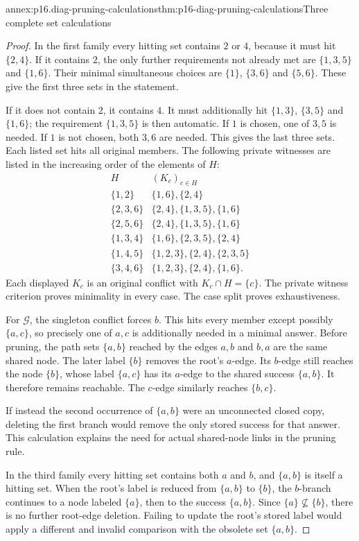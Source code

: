 \begin{annexitem}{annex:p16.diag-pruning-calculations}{thm:p16-diag-pruning-calculations}{Three complete set calculations}
\begin{proof}
In the first family every hitting set contains \(2\)
or \(4\), because it must hit \(\{2,4\}\).
If it contains \(2\), the only further requirements
not already met are \(\{1,3,5\}\) and \(\{1,6\}\).
Their minimal simultaneous choices are \(\{1\}\),
\(\{3,6\}\) and \(\{5,6\}\). These give the first
three sets in the statement.

If it does not contain \(2\), it contains \(4\).
It must additionally hit \(\{1,3\}\), \(\{3,5\}\)
and \(\{1,6\}\); the requirement \(\{1,3,5\}\)
is then automatic. If \(1\) is chosen, one of \(3,5\)
is needed. If \(1\) is not chosen, both \(3,6\)
are needed. This gives the last three sets.
Each listed set hits all original members. The
following private witnesses are listed in the
increasing order of the elements of \(H\):
\[
\begin{array}{c|l}
H&(K_c)_{c\in H}\\ \hline
\{1,2\}&\{1,6\},\{2,4\}\\
\{2,3,6\}&\{2,4\},\{1,3,5\},\{1,6\}\\
\{2,5,6\}&\{2,4\},\{1,3,5\},\{1,6\}\\
\{1,3,4\}&\{1,6\},\{2,3,5\},\{2,4\}\\
\{1,4,5\}&\{1,2,3\},\{2,4\},\{2,3,5\}\\
\{3,4,6\}&\{1,2,3\},\{2,4\},\{1,6\}.
\end{array}
\]
Each displayed \(K_c\) is an original conflict
with \(K_c\cap H=\{c\}\). The private witness
criterion proves minimality in every case.
The case split proves exhaustiveness.

For \(\mathcal G\), the singleton conflict forces
\(b\). This hits every member except possibly
\(\{a,c\}\), so precisely one of \(a,c\) is
additionally needed in a minimal answer.
Before pruning, the path sets \(\{a,b\}\) reached
by the edges \(a,b\) and \(b,a\) are the same
shared node. The later label \(\{b\}\) removes
the root's \(a\)-edge. Its \(b\)-edge still reaches
the node \(\{b\}\), whose label \(\{a,c\}\)
has its \(a\)-edge to the shared success
\(\{a,b\}\). It therefore remains reachable.
The \(c\)-edge similarly reaches \(\{b,c\}\).

If instead the second occurrence of \(\{a,b\}\)
were an unconnected closed copy, deleting the
first branch would remove the only stored success
for that answer. This calculation explains the
need for actual shared-node links in the pruning
rule.

In the third family every hitting set contains
both \(a\) and \(b\), and \(\{a,b\}\) is itself
a hitting set. When the root's label is reduced
from \(\{a,b\}\) to \(\{b\}\), the \(b\)-branch
continues to a node labeled \(\{a\}\), then to
the success \(\{a,b\}\). Since
\(\{a\}\not\subseteq\{b\}\), there is no further
root-edge deletion. Failing to update the root's
stored label would apply a different and invalid
comparison with the obsolete set \(\{a,b\}\).
\end{proof}
\end{annexitem}

